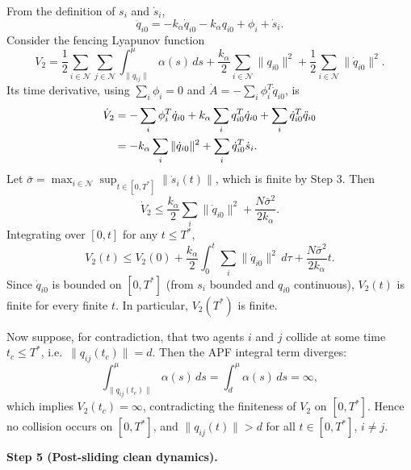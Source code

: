 From the definition of $s_i$ and $\dot{s}_i$,
\begin{equation}
	\ddot{q}_{i0} = -k_\alpha \dot{q}_{i0} - k_\alpha q_{i0} + \phi_i + \dot{s}_i.
	\label{eq7:qddot_transient}
\end{equation}
Consider the fencing Lyapunov function
\begin{equation}
	V_2 = \frac12\sum_{i\in\mathcal{N}}\sum_{j\in\mathcal{N}}
	\int_{\|q_{ij}\|}^{\mu}\alpha(s)\,ds
	+ \frac{k_\alpha}{2}\sum_{i\in\mathcal{N}}\|q_{i0}\|^2
	+ \frac12\sum_{i\in\mathcal{N}}\|\dot{q}_{i0}\|^2.
	\label{eq7:V2}
\end{equation}
Its time derivative, using $\sum_i\phi_i = 0$ and $\dot{A} = -\sum_i\phi_i^T\dot{q}_{i0}$, is
\begin{align}
	\dot{V}_2
	&= -\sum_i\phi_i^T\dot{q}_{i0}
		+ k_\alpha\sum_i q_{i0}^T\dot{q}_{i0}
		+ \sum_i \dot{q}_{i0}^T\ddot{q}_{i0} \notag\\
	&= -k_\alpha\sum_i\|\dot{q}_{i0}\|^2
		+ \sum_i \dot{q}_{i0}^T\dot{s}_i.
		\label{eq7:V2_dot_transient}
\end{align}
Let $\bar\sigma = \max_{i\in\mathcal{N}} \sup_{t\in[0,T^*]} \|\dot{s}_i(t)\|$, which is finite by
Step 3.  Then
\begin{equation}
	\dot{V}_2 \le \frac{k_\alpha}{2}\sum_i\|\dot{q}_{i0}\|^2
		+ \frac{N\bar\sigma^2}{2k_\alpha}.
		\label{eq7:V2_dot_transient_bound}
\end{equation}
Integrating over $[0,t]$ for any $t \le T^*$,
\begin{equation}
	V_2(t) \le V_2(0) + \frac{k_\alpha}{2}\int_0^t \sum_i\|\dot{q}_{i0}\|^2\,d\tau
		+ \frac{N\bar\sigma^2}{2k_\alpha} t.
		\label{eq7:V2_finite}
\end{equation}
Since $\dot{q}_{i0}$ is bounded on $[0,T^*]$ (from $s_i$ bounded and $q_{i0}$ continuous),
$V_2(t)$ is finite for every finite $t$.  In particular, $V_2(T^*)$ is finite.

Now suppose, for contradiction, that two agents $i$ and $j$ collide at some time $t_c \le T^*$,
i.e.~$\|q_{ij}(t_c)\| = d$.  Then the APF integral term diverges:
\begin{equation}
	\int_{\|q_{ij}(t_c)\|}^{\mu}\alpha(s)\,ds
	= \int_{d}^{\mu}\alpha(s)\,ds = \infty,
\end{equation}
which implies $V_2(t_c) = \infty$, contradicting the finiteness of $V_2$ on $[0,T^*]$.
Hence no collision occurs on $[0,T^*]$, and $\|q_{ij}(t)\| > d$ for all $t \in [0,T^*]$,
$i \neq j$.

\medskip\noindent\textbf{Step 5 (Post-sliding clean dynamics).}

